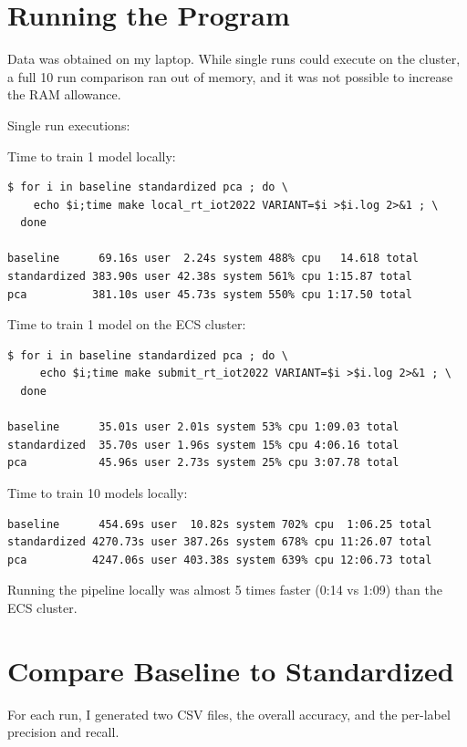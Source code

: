 \documentclass[11pt]{article}
\begin{document}
\section{Running the Program}

Data was obtained on my laptop. While single runs could execute on the cluster, a full 10 run comparison ran out of memory, and it was not possible to increase the RAM allowance.

Single run executions:

Time to train 1 model locally:

\begin{verbatim}
$ for i in baseline standardized pca ; do \
    echo $i;time make local_rt_iot2022 VARIANT=$i >$i.log 2>&1 ; \
  done	
	
baseline      69.16s user  2.24s system 488% cpu   14.618 total
standardized 383.90s user 42.38s system 561% cpu 1:15.87 total
pca          381.10s user 45.73s system 550% cpu 1:17.50 total
\end{verbatim}

Time to train 1 model on the ECS cluster:

\begin{verbatim}
$ for i in baseline standardized pca ; do \
     echo $i;time make submit_rt_iot2022 VARIANT=$i >$i.log 2>&1 ; \
  done	

baseline      35.01s user 2.01s system 53% cpu 1:09.03 total
standardized  35.70s user 1.96s system 15% cpu 4:06.16 total
pca           45.96s user 2.73s system 25% cpu 3:07.78 total
\end{verbatim}

Time to train 10 models locally:

\begin{verbatim}
baseline      454.69s user  10.82s system 702% cpu  1:06.25 total
standardized 4270.73s user 387.26s system 678% cpu 11:26.07 total
pca          4247.06s user 403.38s system 639% cpu 12:06.73 total
\end{verbatim}

Running the pipeline locally was almost 5 times faster (0:14 vs 1:09) than the ECS cluster.

\section{Compare Baseline to Standardized}

For each run, I generated two CSV files, the overall accuracy, and the per-label precision and recall.
\end{document}
